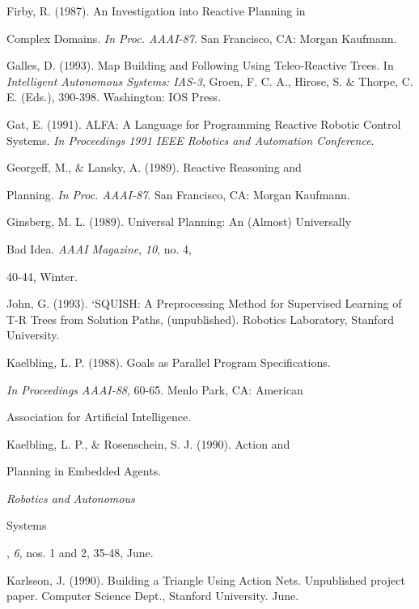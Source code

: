 \begin{thebibliography}{}
Firby, R. (1987). An Investigation into Reactive Planning in 

Complex Domains.  {\it In Proc. AAAI-87}. San Francisco, CA: Morgan Kaufmann.

Galles, D. (1993). Map Building and Following Using Teleo-Reactive Trees. In  
{\it
Intelligent Autonomous Systems: IAS-3}, Groen, F. C. A., Hirose, S. \&  
Thorpe, C. E. (Eds.), 390-398. Washington:  IOS Press.

Gat, E. (1991). ALFA: A Language for Programming Reactive Robotic Control  
Systems. {\it In Proceedings 1991 IEEE Robotics and Automation Conference}.

Georgeff, M., \& Lansky, A. (1989).  Reactive Reasoning and 

Planning.  {\it In Proc. AAAI-87}. San Francisco, CA: Morgan Kaufmann.

Ginsberg, M. L. (1989). Universal Planning: An (Almost) Universally 

Bad Idea.  {\it AAAI Magazine}, {\it 10}, no. 4, 

40-44, Winter.

John, G. (1993).  `SQUISH: A Preprocessing Method for Supervised Learning of  
T-R Trees from Solution Paths, (unpublished). Robotics Laboratory, Stanford  
University.

Kaelbling, L. P. (1988). Goals as Parallel Program Specifications. 

{\it In Proceedings AAAI-88}, 60-65. Menlo Park, CA: American 

Association for Artificial Intelligence.

Kaelbling, L. P., \& Rosenschein, S. J. (1990). Action and 

Planning in Embedded Agents. {\it Robotics and Autonomous 

Systems}, {\it 6}, nos. 1 and 2, 35-48, June.


Karlsson, J. (1990). Building a Triangle Using Action Nets.  Unpublished  
project paper. Computer Science  Dept., Stanford University. June.



\end{thebibliography}
